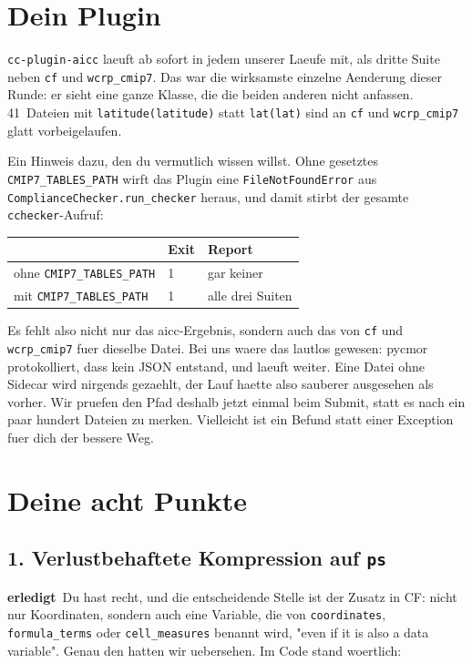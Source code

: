 \documentclass[11pt,a4paper]{article}
\newcommand{\code}[1]{\texttt{\small #1}}
\newcommand{\ok}{\textcolor{green!45!black}{\textbf{erledigt}}}
\begin{document}
\section{Dein Plugin}

\code{cc-plugin-aicc} laeuft ab sofort in jedem unserer Laeufe mit, als dritte Suite
neben \code{cf} und \code{wcrp\_cmip7}. Das war die wirksamste einzelne Aenderung
dieser Runde: er sieht eine ganze Klasse, die die beiden anderen nicht anfassen.
41~Dateien mit \code{latitude(latitude)} statt \code{lat(lat)} sind an \code{cf} und
\code{wcrp\_cmip7} glatt vorbeigelaufen.

Ein Hinweis dazu, den du vermutlich wissen willst. Ohne gesetztes
\code{CMIP7\_TABLES\_PATH} wirft das Plugin eine \code{FileNotFoundError} aus
\code{ComplianceChecker.run\_checker} heraus, und damit stirbt der gesamte
\code{cchecker}-Aufruf:

\begin{center}
\begin{tabular}{lll}
\toprule
& \textbf{Exit} & \textbf{Report} \\
\midrule
ohne \code{CMIP7\_TABLES\_PATH} & 1 & gar keiner \\
mit \code{CMIP7\_TABLES\_PATH}  & 1 & alle drei Suiten \\
\bottomrule
\end{tabular}
\end{center}

Es fehlt also nicht nur das aicc-Ergebnis, sondern auch das von \code{cf} und
\code{wcrp\_cmip7} fuer dieselbe Datei. Bei uns waere das lautlos gewesen: pycmor
protokolliert, dass kein JSON entstand, und laeuft weiter. Eine Datei ohne Sidecar
wird nirgends gezaehlt, der Lauf haette also sauberer ausgesehen als vorher. Wir
pruefen den Pfad deshalb jetzt einmal beim Submit, statt es nach ein paar hundert
Dateien zu merken. Vielleicht ist ein Befund statt einer Exception fuer dich der
bessere Weg.

\section{Deine acht Punkte}

\subsection*{1. Verlustbehaftete Kompression auf \code{ps}}
\ok\ Du hast recht, und die entscheidende Stelle ist der Zusatz in CF: nicht nur
Koordinaten, sondern auch eine Variable, die von \code{coordinates},
\code{formula\_terms} oder \code{cell\_measures} benannt wird, "even if it is also a
data variable". Genau den hatten wir uebersehen. Im Code stand woertlich:
\end{document}
